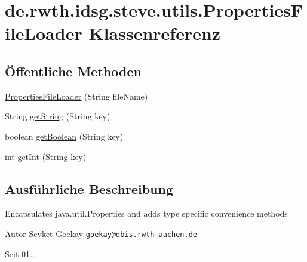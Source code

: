 \hypertarget{classde_1_1rwth_1_1idsg_1_1steve_1_1utils_1_1_properties_file_loader}{\section{de.\+rwth.\+idsg.\+steve.\+utils.\+Properties\+File\+Loader Klassenreferenz}
\label{classde_1_1rwth_1_1idsg_1_1steve_1_1utils_1_1_properties_file_loader}
}
\subsection*{Öffentliche Methoden}
\begin{DoxyCompactItemize}
\item 
\hyperlink{classde_1_1rwth_1_1idsg_1_1steve_1_1utils_1_1_properties_file_loader_a51534f72b7b89c197dca02b31be9d8ea}{Properties\+File\+Loader} (String file\+Name)
\item 
String \hyperlink{classde_1_1rwth_1_1idsg_1_1steve_1_1utils_1_1_properties_file_loader_ae13c6ffe9a581ad909c8f9a8d9327104}{get\+String} (String key)
\item 
boolean \hyperlink{classde_1_1rwth_1_1idsg_1_1steve_1_1utils_1_1_properties_file_loader_ab62b3309d536a7c02d2cc8e55082f24b}{get\+Boolean} (String key)
\item 
int \hyperlink{classde_1_1rwth_1_1idsg_1_1steve_1_1utils_1_1_properties_file_loader_ae1e0d379b046c4b1cd36c79bc89c71a1}{get\+Int} (String key)
\end{DoxyCompactItemize}


\subsection{Ausführliche Beschreibung}
Encapsulates java.\+util.\+Properties and adds type specific convenience methods

\begin{DoxyAuthor}{Autor}
Sevket Goekay \href{mailto:goekay@dbis.rwth-aachen.de}{\tt goekay@dbis.\+rwth-\/aachen.\+de} 
\end{DoxyAuthor}
\begin{DoxySince}{Seit}
01.. 
\end{DoxySince}


